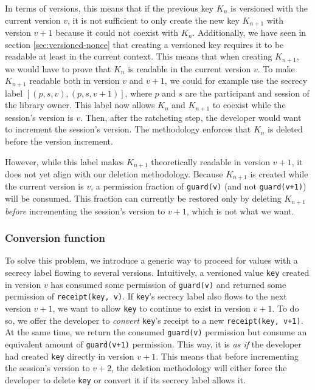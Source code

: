 In terms of versions, this means that if the previous key $K_n$ is versioned with the current version $v$, it is not sufficient to only create the new key $K_{n+1}$ with version $v+1$ because it could not coexist with $K_n$.
Additionally, we have seen in section \ref{sec:versioned-nonce} that creating a versioned key requires it to be readable at least in the current context. This means that when creating $K_{n+1}$, we would have to prove that $K_n$ is readable in the current version $v$. To make $K_{n+1}$ readable both in version $v$ and $v+1$, we could for example use the secrecy label $[(p,s,v), (p,s,v+1)]$, where $p$ and $s$ are the participant and session of the library owner.
This label now allows $K_n$ and $K_{n+1}$ to coexist while the session's version is $v$.
Then, after the ratcheting step, the developer would want to increment the session's version. The methodology enforces that $K_n$ is deleted before the version increment.

However, while this label makes $K_{n+1}$ theoretically readable in version $v+1$, it does not yet align with our deletion methodology. Because $K_{n+1}$ is created while the current version is $v$, a permission fraction of \texttt{guard(v)} (and not \texttt{guard(v+1)}) will be consumed. This fraction can currently be restored only by deleting $K_{n+1}$ \emph{before} incrementing the session's version to $v+1$, which is not what we want.

\subsubsection{Conversion function}
\label{sec:conversion-function}

To solve this problem, we introduce a generic way to proceed for values with a secrecy label flowing to several versions.
Intuitively, a versioned value \texttt{key} created in version $v$ has consumed some permission of \texttt{guard(v)} and returned some permission of \texttt{receipt(key, v)}.
If \texttt{key}'s secrecy label also flows to the next version $v+1$, we want to allow \texttt{key} to continue to exist in version $v+1$.
To do so, we offer the developer to \emph{convert} \texttt{key}'s receipt to a new \texttt{receipt(key, v+1)}. At the same time, we return the consumed \texttt{guard(v)} permission but consume an equivalent amount of \texttt{guard(v+1)} permission.
This way, it is \emph{as if} the developer had created \texttt{key} directly in version $v+1$.
This means that before incrementing the session's version to $v+2$, the deletion methodology will either force the developer to delete \texttt{key} or convert it if its secrecy label allows it.

